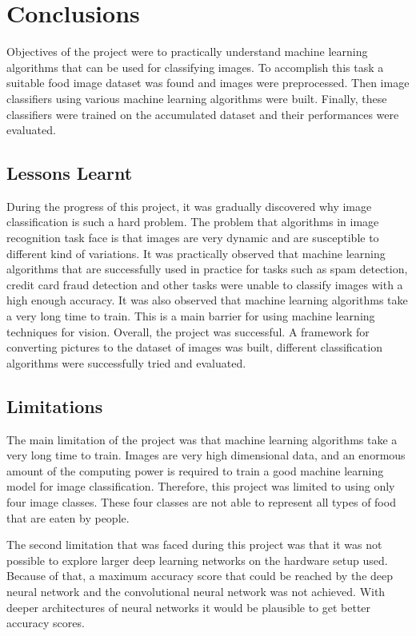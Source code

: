 \chapter{Conclusions}



Objectives of the project were to practically understand machine learning algorithms that can be used for classifying images. To accomplish this  task   a suitable food image dataset was found and images were preprocessed. Then  image classifiers using various machine learning algorithms were built.  Finally, these classifiers were trained  on  the accumulated dataset and  their performances were evaluated.

\section{Lessons Learnt}

During the progress of this project, it was gradually discovered why image classification is such a hard problem.  The problem that algorithms in image recognition task face  is that images are very dynamic and are susceptible to different kind of variations. It was practically observed that machine learning algorithms that are   successfully  used in practice for tasks such as spam detection, credit card fraud detection and other tasks were unable to classify images with a high enough accuracy.  It was also observed that machine learning algorithms take a very long time to train. This is  a  main barrier for using machine learning techniques for vision. Overall, the project was successful. A framework for converting pictures to the dataset of images was built, different classification algorithms were successfully tried and evaluated.

\section{Limitations}
The main limitation of the project was that machine learning algorithms take a very long time to train. Images are very high dimensional data, and an enormous amount of the computing power is required to train a good machine learning model for image classification. Therefore, this project was limited to using only four image classes. These four classes are not able to represent all types of food that are eaten by people.

The second limitation that was faced during this project was that it was not possible to explore larger deep learning networks on the hardware setup  used. Because of that, a maximum  accuracy score that could be reached by the  deep neural network and the  convolutional neural network was not achieved. With deeper architectures of neural networks it would be plausible to get  better accuracy scores.

